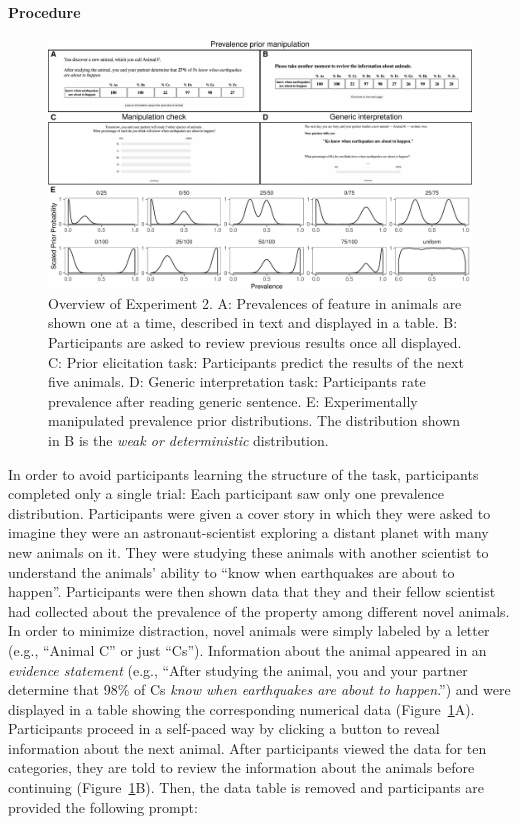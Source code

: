 \documentclass[floatsintext,doc]{apa6}
\let\oldparagraph\paragraph
\renewcommand{\paragraph}[1]{\oldparagraph{#1}\mbox{}}
\begin{document}
\hypertarget{procedure}{%
\paragraph{Procedure}\label{procedure}}

\begin{figure}
\centering
\includegraphics{genint_files/figure-latex/priorManipulationExpt-1.pdf}
\caption{\label{fig:priorManipulationExpt}Overview of Experiment 2. A: Prevalences of feature in animals are shown one at a time, described in text and displayed in a table. B: Participants are asked to review previous results once all displayed. C: Prior elicitation task: Participants predict the results of the next five animals. D: Generic interpretation task: Participants rate prevalence after reading generic sentence. E: Experimentally manipulated prevalence prior distributions. The distribution shown in B is the \emph{weak or deterministic} distribution.}
\end{figure}

In order to avoid participants learning the structure of the task, participants completed only a single trial: Each participant saw only one prevalence distribution.
Participants were given a cover story in which they were asked to imagine they were an astronaut-scientist exploring a distant planet with many new animals on it.
They were studying these animals with another scientist to understand the animals' ability to \enquote{know when earthquakes are about to happen}.
Participants were then shown data that they and their fellow scientist had collected about the prevalence of the property among different novel animals.
In order to minimize distraction, novel animals were simply labeled by a letter (e.g., \enquote{Animal C} or just \enquote{Cs}).
Information about the animal appeared in an \emph{evidence statement} (e.g., \enquote{After studying the animal, you and your partner determine that 98\% of Cs \emph{know when earthquakes are about to happen}.}) and were displayed in a table showing the corresponding numerical data (Figure~\ref{fig:priorManipulationExpt}A).
Participants proceed in a self-paced way by clicking a button to reveal information about the next animal.
After participants viewed the data for ten categories, they are told to review the information about the animals before continuing (Figure~\ref{fig:priorManipulationExpt}B).
Then, the data table is removed and participants are provided the following prompt:
\end{document}
